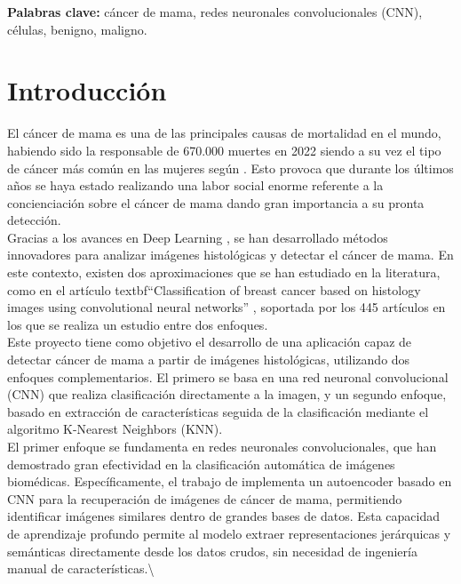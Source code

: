 \documentclass[12pt]{article} %
\begin{document}
\vspace{.5cm}

\textbf{Palabras clave:} cáncer de mama, redes neuronales convolucionales (CNN), células, benigno, maligno.

\newpage
\tableofcontents

\newpage

\section{Introducción}
El cáncer de mama es una de las principales causas de mortalidad en el mundo, habiendo sido la responsable de 670.000 muertes en 2022 siendo a su vez el tipo de cáncer más común en las mujeres según \cite{who_breast_cancer}. Esto provoca que durante los últimos años se haya estado realizando una labor social enorme referente a la concienciación sobre el cáncer de mama dando gran importancia a su pronta detección.\\

Gracias a los avances en Deep Learning \cite{shinde2018review}, se han desarrollado métodos innovadores para analizar imágenes histológicas y detectar el cáncer de mama. En este contexto, existen dos aproximaciones que se han estudiado en la literatura, como en el artículo textbf{“Classification of breast cancer based on histology images using convolutional neural networks}” \cite{bardou2018classification}, soportada por los 445 artículos en los que se realiza un estudio entre dos enfoques.\\

Este proyecto tiene como objetivo el desarrollo de una aplicación capaz de detectar cáncer de mama a partir de imágenes histológicas, utilizando dos enfoques complementarios. El primero se basa en una red neuronal convolucional (CNN) que realiza clasificación directamente a la imagen, y un segundo enfoque, basado en extracción de características seguida de la clasificación mediante el algoritmo K-Nearest Neighbors (KNN).\\

El primer enfoque se fundamenta en redes neuronales convolucionales, que han demostrado gran efectividad en la clasificación automática de imágenes biomédicas. Específicamente, el trabajo de \cite{minarno2021cnn} implementa un autoencoder basado en CNN para la recuperación de imágenes de cáncer de mama, permitiendo identificar imágenes similares dentro de grandes bases de datos. Esta capacidad de aprendizaje profundo permite al modelo extraer representaciones jerárquicas y semánticas directamente desde los datos crudos, sin necesidad de ingeniería manual de características.\textbackslash{}
\end{document}
